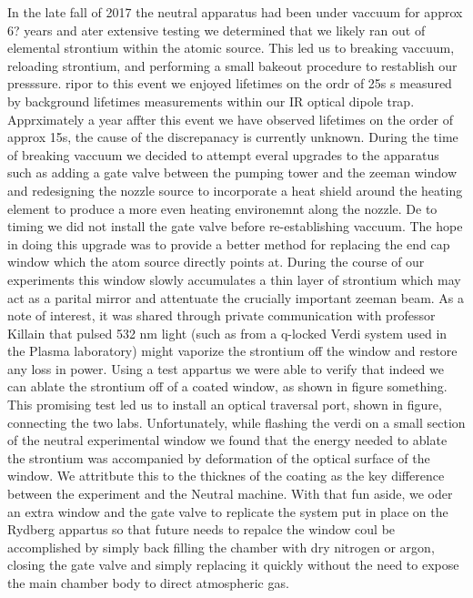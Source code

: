 In the late fall of 2017 the neutral apparatus had been under vaccuum for approx 6? years and ater extensive testing we determined that we likely ran out of elemental strontium within the atomic source. 
This led us to breaking vaccuum, reloading strontium, and performing a small bakeout procedure to restablish our presssure. ripor to this event we enjoyed lifetimes on the ordr of 25s s measured by background lifetimes measurements within our IR optical dipole trap. 
Apprximately a year affter this event we have observed lifetimes on the order of approx 15s, the cause of the discrepanacy is currently unknown.
During the time of breaking vaccuum we decided to attempt everal upgrades to the apparatus such as adding a gate valve between the pumping tower and the zeeman window and redesigning the nozzle source to incorporate a heat shield around the heating element to produce a more even heating environemnt along the nozzle. 
De to timing we did not install the gate valve before re-establishing vaccuum. 
The hope in doing this upgrade was to provide a better method for replacing the end cap window which the atom source directly points at. 
During the course of our experiments this window slowly accumulates a thin layer of strontium which may act as a parital mirror and attentuate the crucially important zeeman beam. 
As a note of interest, it was shared through private communication with professor Killain that pulsed 532 nm light (such as from a q-locked Verdi system used in the Plasma laboratory) might vaporize the strontium off the window and restore any loss in power. Using a test appartus we were able to verify that indeed we can ablate the strontium off of a coated window, as shown in figure something.
This promising test led us to install an optical traversal port, shown in figure, connecting the two labs. Unfortunately, while flashing the verdi on a small section of the neutral experimental window we found that the energy needed to ablate the strontium was accompanied by deformation of the optical surface of the window. We attritbute this to the thicknes of the coating as the key difference between the experiment and the Neutral machine.
With that fun aside, we oder an extra window and the gate valve to replicate the system put in place on the Rydberg appartus so that future needs to repalce the window coul be accomplished by simply back filling the chamber with dry nitrogen or argon, closing the gate valve and simply replacing it quickly without the need to expose the main chamber body to direct atmospheric gas. 

